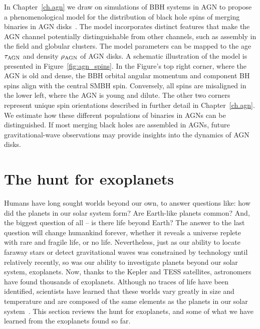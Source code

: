 In Chapter~\ref{ch.agn} we draw on simulations of BBH systems in AGN to propose a phenomenological model for the distribution of black hole spins of merging binaries in AGN disks~\cite{agn_migration_trap, agn_bbh_rates, agn_orbital_evol, agn_migration_1, agn_migration_2}. 
The model incorporates distinct features that make the AGN channel potentially distinguishable from other channels, such as assembly in the field and globular clusters. 
The model parameters can be mapped to the age $\tau_{\rm AGN}$ and density $\rho_{\rm AGN}$ of AGN disks. 
A schematic illustration of the model is presented in Figure~\ref{fig:agn_spins}. 
In the Figure's top right corner, where the AGN is old and dense, the BBH orbital angular momentum and component BH spins align with the central SMBH spin. 
Conversely, all spins are misaligned in the lower left, where the AGN is young and dilute. The other two corners represent unique spin orientations described in further detail in Chapter~\ref{ch.agn}.
We estimate how these different populations of binaries in AGNs can be distinguished.
If most merging black holes are assembled in AGNs, future gravitational-wave observations may provide insights into the dynamics of AGN disks.

\section{The hunt for exoplanets}

Humans have long sought worlds beyond our own, to answer questions like: how did the planets in our solar system form? Are Earth-like planets common? And, the biggest question of all -- is there life beyond Earth? 
The answer to the last question will change humankind forever, whether it reveals a universe replete with rare and fragile life, or no life. 
Nevertheless, just as our ability to locate faraway stars or detect gravitational waves was constrained by technology until relatively recently, so was our ability to investigate planets beyond our solar system, exoplanets.
Now, thanks to the Kepler and TESS satellites, astronomers have found thousands of exoplanets.
Although no traces of life have been identified, scientists have learned that these worlds vary greatly in size and temperature and are composed of the same elements as the planets in our solar system~\cite{Traub:2012:ApJ, Morris:2017:ApJ, Yu:2017:ApJ}.
This section reviews the hunt for exoplanets, and some of what we have learned from the exoplanets found so far.

